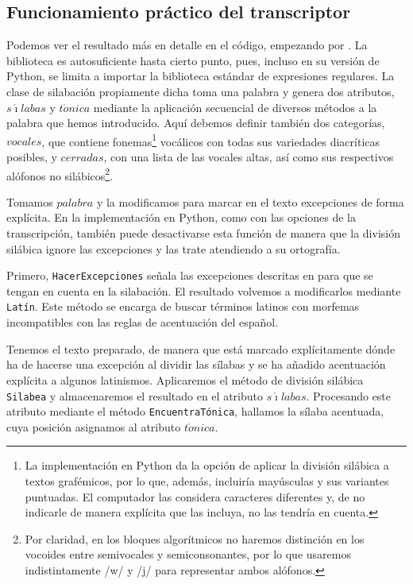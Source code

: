 \subsection{Funcionamiento práctico del transcriptor}
Podemos ver el resultado más en detalle en el código, empezando por . La biblioteca es autosuficiente hasta cierto punto, pues, incluso en su versión de Python, se limita a importar la biblioteca estándar de expresiones regulares. La clase de silabación propiamente dicha toma una palabra y genera dos atributos, $s\acute{\imath}labas$ y $t\acute{o}nica$ mediante la aplicación secuencial de diversos métodos a la palabra que hemos introducido. Aquí debemos definir también dos categorías, $vocales$, que contiene fonemas\footnote{La implementación en Python da la opción de aplicar la división silábica a textos grafémicos, por lo que, además, incluiría mayúsculas y sus variantes puntuadas. El computador las considera caracteres diferentes y, de no indicarle de manera explícita que las incluya, no las tendría en cuenta.} vocálicos con todas sus variedades diacríticas posibles, y $cerradas$, con una lista de las vocales altas, así como sus respectivos alófonos no silábicos\footnote{Por claridad, en los bloques algorítmicos no haremos distinción en los vocoides entre semivocales y semiconsonantes, por lo que usaremos indistintamente /w/ y /j/ para representar ambos alófonos.}.

Tomamos $palabra$ y la modificamos para marcar en el texto excepciones de forma explícita. En la implementación en Python, como con las opciones de la transcripción, también puede desactivarse esta función de manera que la división silábica ignore las excepciones y las trate atendiendo a su ortografía.

Primero, \texttt{HacerExcepciones} señala las excepciones descritas en  para que se tengan en cuenta en la silabación. El resultado volvemos a modificarlos mediante \texttt{Latín}. Este método se encarga de buscar términos latinos con morfemas incompatibles con las reglas de acentuación del español.

 Tenemos el texto preparado, de manera que está marcado explícitamente dónde ha de hacerse una excepción al dividir las sílabas y se ha añadido acentuación explícita a algunos latinismos. Aplicaremos el método de división silábica \texttt{Silabea} y almacenaremos el resultado en el atributo $s\acute{\imath}labas$. Procesando este atributo mediante el método \texttt{EncuentraTónica}, hallamos la sílaba acentuada, cuya posición asignamos al atributo $t\acute{o}nica$.  

